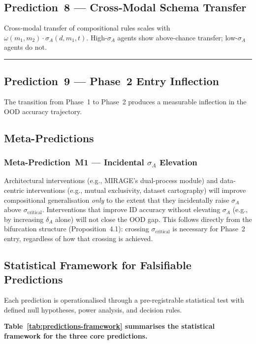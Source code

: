\documentclass[11pt]{article}
\theoremstyle{definition}
\theoremstyle{plain}
\begin{document}
\subsection{Prediction~8 --- Cross-Modal Schema Transfer}
Cross-modal transfer of compositional rules scales with
$\omega(m_1, m_2) \cdot \sigma_A(d, m_1, t)$. High-$\sigma_A$ agents
show above-chance transfer; low-$\sigma_A$ agents do not.

\noindent\rule{\linewidth}{0.4pt}

\subsection{Prediction~9 --- Phase~2 Entry Inflection}
The transition from Phase~1 to Phase~2 produces a measurable inflection
in the OOD accuracy trajectory.

\subsection*{Meta-Predictions}

\subsubsection*{Meta-Prediction~M1 --- Incidental \texorpdfstring{$\sigma_A$}{sigma\_A} Elevation}\label{sec:meta-M1}
Architectural interventions (e.g., MIRAGE's dual-process module) and
data-centric interventions (e.g., mutual exclusivity, dataset
cartography) will improve compositional generalisation \emph{only}
to the extent that they incidentally raise $\sigma_A$ above
$\sigma_{\text{critical}}$. Interventions that improve ID accuracy
without elevating $\sigma_A$ (e.g., by increasing $\delta_A$ alone)
will not close the OOD gap. This follows directly from the
bifurcation structure (Proposition~4.1): crossing
$\sigma_{\text{critical}}$ is necessary for Phase~2 entry, regardless
of how that crossing is achieved.

\subsection{Statistical Framework for Falsifiable Predictions}\label{sec:statistical-framework}

Each prediction is operationalised through a pre-registrable statistical
test with defined null hypotheses, power analysis, and decision rules.

\textbf{Table~\ref{tab:predictions-framework} summarises the statistical
framework for the three core predictions.}
\end{document}
